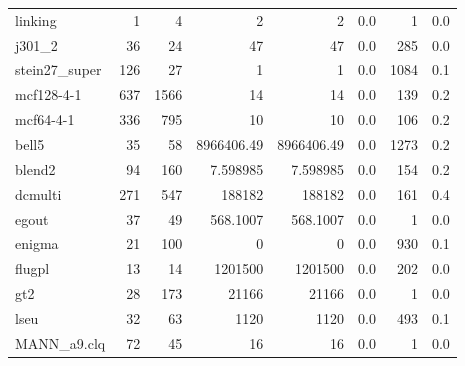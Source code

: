 \documentclass[leqno]{article}
\begin{document}
\begin{center}
\setlength{\tabcolsep}{2pt}
\newcommand{\g}{\raisebox{0.25ex}{\tiny $>$}}
\tablelasttail{\bottomrule}
\begin{supertabular*}{\textwidth}{@{\extracolsep{\fill}}lrrrrrrr@{}}
linking            &      1 &      4 &                2 &                2 &    0.0 &         1 &      0.0\\
j301\_2            &     36 &     24 &               47 &               47 &    0.0 &       285 &      0.0\\
stein27\_super     &    126 &     27 &                1 &                1 &    0.0 &      1084 &      0.1\\
mcf128-4-1         &    637 &   1566 &               14 &               14 &    0.0 &       139 &      0.2\\
mcf64-4-1          &    336 &    795 &               10 &               10 &    0.0 &       106 &      0.2\\
bell5              &     35 &     58 &       8966406.49 &       8966406.49 &    0.0 &      1273 &      0.2\\
blend2             &     94 &    160 &         7.598985 &         7.598985 &    0.0 &       154 &      0.2\\
dcmulti            &    271 &    547 &           188182 &           188182 &    0.0 &       161 &      0.4\\
egout              &     37 &     49 &         568.1007 &         568.1007 &    0.0 &         1 &      0.0\\
enigma             &     21 &    100 &                0 &                0 &    0.0 &       930 &      0.1\\
flugpl             &     13 &     14 &          1201500 &          1201500 &    0.0 &       202 &      0.0\\
gt2                &     28 &    173 &            21166 &            21166 &    0.0 &         1 &      0.0\\
lseu               &     32 &     63 &             1120 &             1120 &    0.0 &       493 &      0.1\\
MANN\_a9.clq       &     72 &     45 &               16 &               16 &    0.0 &         1 &      0.0\\

\end{supertabular*}
\end{center}
\end{document}
